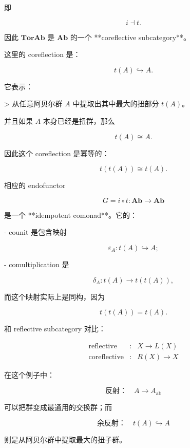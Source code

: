 \documentclass{ctexart}
\begin{document}
\begin{markdown}
即

$$
i\dashv t.
$$

因此 $\mathbf{TorAb}$ 是 $\mathbf{Ab}$ 的一个 **coreflective subcategory**。

这里的 coreflection 是：

$$
t(A)\hookrightarrow A.
$$

它表示：

> 从任意阿贝尔群 $A$ 中提取出其中最大的扭部分 $t(A)$。

并且如果 $A$ 本身已经是扭群，那么

$$
t(A)\cong A.
$$

因此这个 coreflection 是幂等的：

$$
t(t(A))\cong t(A).
$$

相应的 endofunctor

$$
G=i\circ t:\mathbf{Ab}\to\mathbf{Ab}
$$

是一个 **idempotent comonad**。它的：

- counit 是包含映射

  $$
  \varepsilon_A:t(A)\hookrightarrow A;
  $$

- comultiplication 是

  $$
  \delta_A:t(A)\to t(t(A)),
  $$

  而这个映射实际上是同构，因为

  $$
  t(t(A))=t(A).
  $$

和 reflective subcategory 对比：

$$
\begin{array}{ccl}
\text{reflective} &:& X\to L(X)\\
\text{coreflective} &:& R(X)\to X
\end{array}
$$

在这个例子中：

$$
\text{反射：}\quad A\to A_{\mathrm{ab}}
$$

可以把群变成最通用的交换群；而

$$
\text{余反射：}\quad t(A)\hookrightarrow A
$$

则是从阿贝尔群中提取最大的扭子群。
\end{markdown}
\end{document}

